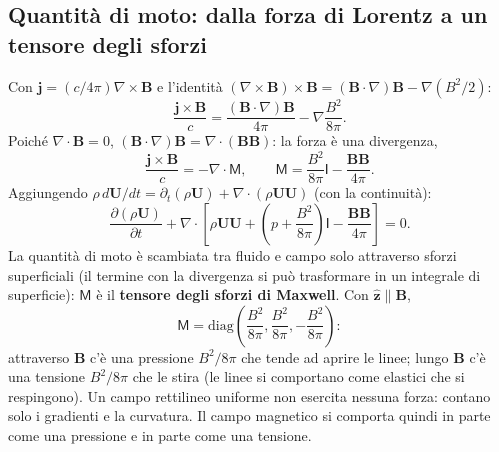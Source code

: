 \subsection{Quantità di moto: dalla forza di Lorentz a un tensore degli sforzi}
Con $\mathbf{j}=(c/4\pi)\nabla\times\mathbf{B}$ e l'identità $(\nabla\times\mathbf{B})\times\mathbf{B}=(\mathbf{B}\cdot\nabla)\mathbf{B}-\nabla(B^2/2)$:
\begin{equation}
\frac{\mathbf{j}\times\mathbf{B}}{c}=\frac{(\mathbf{B}\cdot\nabla)\mathbf{B}}{4\pi}-\nabla\frac{B^2}{8\pi} .
\end{equation}
Poiché $\nabla\cdot\mathbf{B}=0$, $(\mathbf{B}\cdot\nabla)\mathbf{B}=\nabla\cdot(\mathbf{B}\mathbf{B})$: la forza è una divergenza,
\begin{equation}
\frac{\mathbf{j}\times\mathbf{B}}{c}=-\nabla\cdot\mathsf{M},\qquad\mathsf{M}=\frac{B^2}{8\pi}\mathsf{I}-\frac{\mathbf{B}\mathbf{B}}{4\pi}.
\end{equation}
Aggiungendo $\rho\,d\mathbf{U}/dt=\partial_t(\rho\mathbf{U})+\nabla\cdot(\rho\mathbf{U}\mathbf{U})$ (con la continuità):
\begin{equation}
\frac{\partial(\rho\mathbf{U})}{\partial t}+\nabla\cdot\left[\rho\mathbf{U}\mathbf{U}+\left(p+\frac{B^2}{8\pi}\right)\mathsf{I}-\frac{\mathbf{B}\mathbf{B}}{4\pi}\right]=0 .
\end{equation}
La quantità di moto è scambiata tra fluido e campo solo attraverso sforzi superficiali (il termine con la divergenza si può trasformare in un integrale di superficie): $\mathsf{M}$ è il \textbf{tensore degli sforzi di Maxwell}. Con $\hat{\mathbf{z}}\parallel\mathbf{B}$,
\begin{equation}
\mathsf{M}=\mathrm{diag}\left(\frac{B^2}{8\pi},\frac{B^2}{8\pi},-\frac{B^2}{8\pi}\right):
\end{equation}
attraverso $\mathbf{B}$ c'è una pressione $B^2/8\pi$ che tende ad aprire le linee; lungo $\mathbf{B}$ c'è una tensione $B^2/8\pi$ che le stira (le linee si comportano come elastici che si respingono). Un campo rettilineo uniforme non esercita nessuna forza: contano solo i gradienti e la curvatura. Il campo magnetico si comporta quindi in parte come una pressione e in parte come una tensione.


